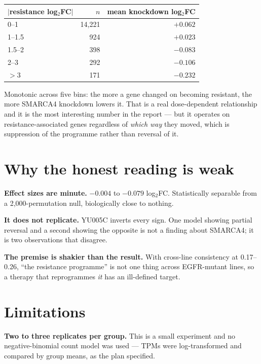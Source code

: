 \documentclass[11pt,a4paper]{article}
\begin{document}
\begin{center}
\begin{tabular}{@{}lrr@{}}
\toprule
\textbf{$|$resistance log$_2$FC$|$} & \textbf{$n$} & \textbf{mean knockdown log$_2$FC} \\
\midrule
0--1 & 14{,}221 & $+0.062$ \\
1--1.5 & \phantom{0}\phantom{0}924 & $+0.023$ \\
1.5--2 & \phantom{0}\phantom{0}398 & $-0.083$ \\
2--3 & \phantom{0}\phantom{0}292 & $-0.106$ \\
$>3$ & \phantom{0}\phantom{0}171 & $\mathbf{-0.232}$ \\
\bottomrule
\end{tabular}
\end{center}

Monotonic across five bins: the more a gene changed on becoming resistant, the more SMARCA4
knockdown lowers it. That is a real dose-dependent relationship and it is the most interesting
number in the report --- but it operates on resistance-associated genes regardless of \emph{which
way} they moved, which is suppression of the programme rather than reversal of it.

\section{Why the honest reading is weak}

\textbf{Effect sizes are minute.} $-0.004$ to $-0.079$ log$_2$FC. Statistically separable from a
2{,}000-permutation null, biologically close to nothing.

\textbf{It does not replicate.} YU005C inverts every sign. One model showing partial reversal and a
second showing the opposite is not a finding about SMARCA4; it is two observations that disagree.

\textbf{The premise is shakier than the result.} With cross-line consistency at 0.17--0.26, ``the
resistance programme'' is not one thing across EGFR-mutant lines, so a therapy that reprogrammes
\emph{it} has an ill-defined target.

\section{Limitations}

\textbf{Two to three replicates per group.} This is a small experiment and no negative-binomial
count model was used --- TPMs were log-transformed and compared by group means, as the plan
specified.
\end{document}
